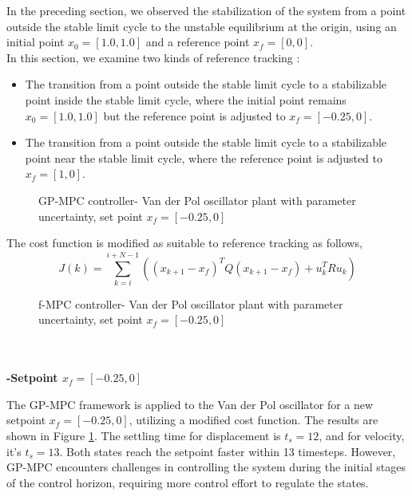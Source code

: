In the preceding section, we observed the stabilization of the system from a point outside the stable limit cycle to the unstable equilibrium at the origin, using an initial point $x_0 = [1.0, 1.0]$ and a reference point $x_f = [0, 0]$. 
\\
\quad
In this section, we examine two kinds of reference tracking :

\begin{itemize}
    \item The transition from a point outside the stable limit cycle to a stabilizable point inside the stable limit cycle, where the initial point remains $x_0 = [1.0, 1.0]$ but the reference point is adjusted to $x_f = [-0.25, 0]$.
    \item The transition from a point outside the stable limit cycle to a stabilizable point near the stable limit cycle, where the reference point is adjusted to $x_f = [1, 0]$.
\end{itemize}




\begin{figure}
    \centering
    
    \caption{GP-MPC controller- Van der Pol oscillator plant with parameter uncertainty, set point $x_f= [-0.25,0]$}
    \label{fig:Gp-mpc_unc_vdp_setpoint}
\end{figure}

The cost function is modified as suitable to reference tracking as follows,
\begin{equation}
    J(k) = \sum_{k=i}^{i+N-1}( (x_{k+1}-x_f)^T Q (x_{k+1}-x_f) + u_k^T R u_k ) 
\end{equation}

\begin{figure}
    \centering
    
    \caption{f-MPC controller- Van der Pol oscillator plant with parameter uncertainty, set point $x_f= [-0.25,0]$}
    \label{fig:f-mpc_unc_vdp_setpoint}
\end{figure}
\\
\\
\textbf{-Setpoint $x_f= [-0.25,0]$}

The GP-MPC framework is applied to the Van der Pol oscillator for a new setpoint $x_f= [-0.25,0]$, utilizing a modified cost function. The results are shown in Figure \ref{fig:Gp-mpc_unc_vdp_setpoint}. The settling time for displacement is $t_s=12$, and for velocity, it's $t_s=13$. Both states reach the setpoint faster within 13 timesteps. However, GP-MPC encounters challenges in controlling the system during the initial stages of the control horizon, requiring more control effort to regulate the states.


